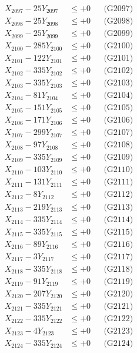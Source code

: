 \documentclass[a4paper,10pt]{article}
\begin{document}
{\begin{align}
X_{2097} - 25Y_{2097} &\leq +0 && \text{(G2097)} \\
X_{2098} - 25Y_{2098} &\leq +0 && \text{(G2098)} \\
X_{2099} - 25Y_{2099} &\leq +0 && \text{(G2099)} \\
X_{2100} - 285Y_{2100} &\leq +0 && \text{(G2100)} \\
\allowbreak
X_{2101} - 122Y_{2101} &\leq +0 && \text{(G2101)} \\
X_{2102} - 335Y_{2102} &\leq +0 && \text{(G2102)} \\
X_{2103} - 335Y_{2103} &\leq +0 && \text{(G2103)} \\
X_{2104} - 81Y_{2104} &\leq +0 && \text{(G2104)} \\
X_{2105} - 151Y_{2105} &\leq +0 && \text{(G2105)} \\
X_{2106} - 171Y_{2106} &\leq +0 && \text{(G2106)} \\
X_{2107} - 299Y_{2107} &\leq +0 && \text{(G2107)} \\
X_{2108} - 97Y_{2108} &\leq +0 && \text{(G2108)} \\
X_{2109} - 335Y_{2109} &\leq +0 && \text{(G2109)} \\
X_{2110} - 103Y_{2110} &\leq +0 && \text{(G2110)} \\
\allowbreak
X_{2111} - 131Y_{2111} &\leq +0 && \text{(G2111)} \\
X_{2112} - 8Y_{2112} &\leq +0 && \text{(G2112)} \\
X_{2113} - 219Y_{2113} &\leq +0 && \text{(G2113)} \\
X_{2114} - 335Y_{2114} &\leq +0 && \text{(G2114)} \\
X_{2115} - 335Y_{2115} &\leq +0 && \text{(G2115)} \\
X_{2116} - 89Y_{2116} &\leq +0 && \text{(G2116)} \\
X_{2117} - 3Y_{2117} &\leq +0 && \text{(G2117)} \\
X_{2118} - 335Y_{2118} &\leq +0 && \text{(G2118)} \\
X_{2119} - 91Y_{2119} &\leq +0 && \text{(G2119)} \\
X_{2120} - 207Y_{2120} &\leq +0 && \text{(G2120)} \\
\allowbreak
X_{2121} - 335Y_{2121} &\leq +0 && \text{(G2121)} \\
X_{2122} - 335Y_{2122} &\leq +0 && \text{(G2122)} \\
X_{2123} - 4Y_{2123} &\leq +0 && \text{(G2123)} \\
X_{2124} - 335Y_{2124} &\leq +0 && \text{(G2124)} \\

\end{align}}
\end{document}
